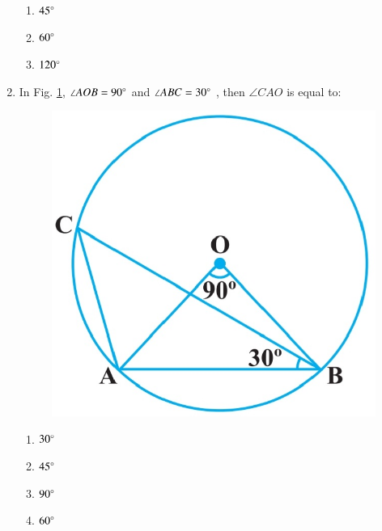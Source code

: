 \documentclass{article}
\begin{document}
\begin{enumerate}
\begin{enumerate}
\item $45\degree$
\item $60\degree$
\item $120\degree$
\end{enumerate}
\item In Fig. \ref{fig:10.9}, $\angle AOB = 90\degree$ and $\angle ABC = 30\degree$ , then $\angle CAO$ is equal to:            
\begin{figure}[H]
\centering
\includegraphics[width=\columnwidth]{figs/10.9.jpg}
\caption{}
\label{fig:10.9}
\end{figure}
\begin{enumerate}
\item $30\degree$
\item $45\degree$
\item $90\degree$
\item $60\degree$
\end{enumerate}
\end{enumerate}
\end{document}
